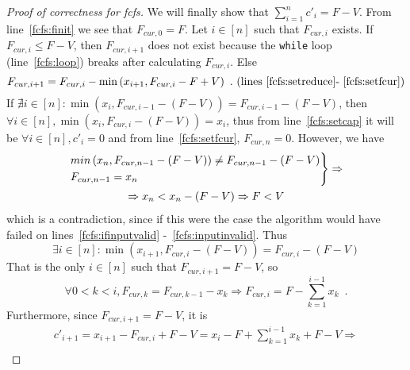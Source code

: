 \begin{proof}[Proof of correctness for fcfs]
   We will finally show that $\sum\limits_{i=1}^{n}c'_i = F - V$. From line~\ref{fcfs:finit} we see that $F_{cur,0} = F$.
   Let $i \in [n]$ such that $F_{cur, i}$ exists. If $F_{cur, i} \leq F - V$, then $F_{cur,i+1}$ does not exist because the
   \texttt{while} loop (line~\ref{fcfs:loop}) breaks after calculating $F_{cur,i}$. Else
   \begin{equation*}
      F_{cur,i+1} = F_{cur,i} - \min{(x_{i+1}, F_{cur,i} - F + V)} \enspace.
      \mbox{ (lines~\ref{fcfs:setreduce}-~\ref{fcfs:setfcur})}
   \end{equation*}
   If $\nexists i \in [n]: \min{\left(x_i, F_{cur, i-1} - \left(F - V\right)\right)} = F_{cur,i-1} - \left(F - V\right)$,
   then $\forall i \in [n], \min{\left(x_i, F_{cur, i} - \left(F - V\right)\right)} = x_i$, thus from line~\ref{fcfs:setcap}
   it will be $\forall i \in [n], c'_i = 0$ and from line~\ref{fcfs:setfcur}, $F_{cur, n} = 0$. However, we have
   \begin{equation*}
   \begin{gathered}
   \begin{rcases}
      min\left(x_n, F_{cur, n-1} - \left(F - V\right)\right) \neq F_{cur, n-1} - \left(F - V\right) \\
      F_{cur, n-1} = x_n
   \end{rcases} \Rightarrow \\
   \Rightarrow x_n < x_n - \left(F - V\right) \Rightarrow F < V
   \end{gathered}
   \end{equation*}
   which is a contradiction, since if this were the case the algorithm would have failed on lines~\ref{fcfs:ifinputvalid}
   -~\ref{fcfs:inputinvalid}. Thus
   \begin{equation*}
      \exists i \in [n]: \min{\left(x_{i+1}, F_{cur, i} - \left(F - V\right)\right)} = F_{cur,i} - \left(F - V\right)
   \end{equation*}
   That is the only $i \in [n]$ such that $F_{cur,i+1} = F - V$, so
   \begin{equation*}
      \forall 0 < k < i, F_{cur,k} = F_{cur,k-1} - x_k \Rightarrow F_{cur,i} = F - \sum\limits_{k=1}^{i-1}x_k \enspace.
   \end{equation*}
   Furthermore, since $F_{cur,i+1} = F - V$, it is
   \begin{equation*}
   \begin{gathered}
      c'_{i+1} = x_{i+1} - F_{cur,i} + F - V = x_i - F + \sum\limits_{k=1}^{i-1}x_k + F - V \Rightarrow \\

\end{gathered}
\end{equation*}
\end{proof}
